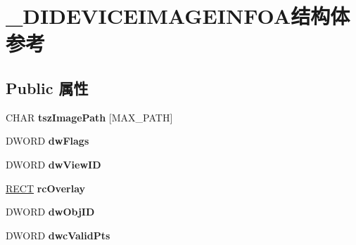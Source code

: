 \hypertarget{struct___d_i_d_e_v_i_c_e_i_m_a_g_e_i_n_f_o_a}{}\section{\+\_\+\+D\+I\+D\+E\+V\+I\+C\+E\+I\+M\+A\+G\+E\+I\+N\+F\+O\+A结构体 参考}
\label{struct___d_i_d_e_v_i_c_e_i_m_a_g_e_i_n_f_o_a}
\subsection*{Public 属性}
\begin{DoxyCompactItemize}
\item 
\mbox{\label{struct___d_i_d_e_v_i_c_e_i_m_a_g_e_i_n_f_o_a_a34d1d8745b65509c3a8fc2667f2465e2}} 
C\+H\+AR {\bfseries tsz\+Image\+Path} \mbox{[}M\+A\+X\+\_\+\+P\+A\+TH\mbox{]}
\item 
\mbox{\label{struct___d_i_d_e_v_i_c_e_i_m_a_g_e_i_n_f_o_a_af0437c16afc64ee64b98b238b2fb45b0}} 
D\+W\+O\+RD {\bfseries dw\+Flags}
\item 
\mbox{\label{struct___d_i_d_e_v_i_c_e_i_m_a_g_e_i_n_f_o_a_a92ccae5864a5fc90c436ad1283451275}} 
D\+W\+O\+RD {\bfseries dw\+View\+ID}
\item 
\mbox{\label{struct___d_i_d_e_v_i_c_e_i_m_a_g_e_i_n_f_o_a_a7772cf69142ae9e20c40344bc944fd17}} 
\hyperlink{structtag_r_e_c_t}{R\+E\+CT} {\bfseries rc\+Overlay}
\item 
\mbox{\label{struct___d_i_d_e_v_i_c_e_i_m_a_g_e_i_n_f_o_a_ad5edd4b03c80e9a940fab0641683d29c}} 
D\+W\+O\+RD {\bfseries dw\+Obj\+ID}
\item 
\mbox{\label{struct___d_i_d_e_v_i_c_e_i_m_a_g_e_i_n_f_o_a_a4a6b8186fd30a70a4be640b4e66cf7b9}} 
D\+W\+O\+RD {\bfseries dwc\+Valid\+Pts}
\item 
\mbox{\label{struct___d_i_d_e_v_i_c_e_i_m_a_g_e_i_n_f_o_a_a6d10e3b6bfb7e4bd373be9369b9aefa6}} 

\end{DoxyCompactItemize}
